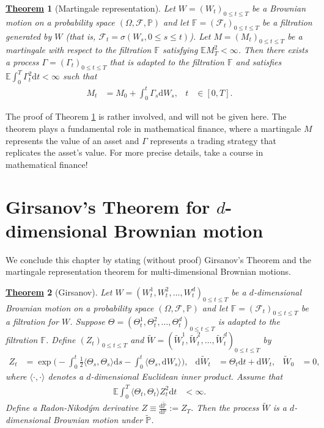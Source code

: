\documentclass[12pt]{book}
\numberwithin{equation}{chapter}
\theoremstyle{plain}
\newtheorem{theorem}{\underline{Theorem}}
\numberwithin{theorem}{section}
\theoremstyle{definition}
\numberwithin{exercise}{chapter}
\newcommand{\<}{\langle}
\renewcommand{\>}{\rangle}
\renewcommand{\(}{\left(}
\renewcommand{\)}{\right)}
\renewcommand{\[}{\left[}
\renewcommand{\]}{\right]}
\newcommand\Eb{\mathds{E}}
\newcommand\Fb{\mathds{F}}
\newcommand\Pb{\mathds{P}}
\newcommand\Fc{\mathscr{F}}
\newcommand\Om{\Omega}
\newcommand\sig{\sigma}
\newcommand\Gam{\Gamma}
\newcommand\Pbt{\widetilde{\Pb}}
\newcommand\Wt{\widetilde{W}}
\newcommand\dd{\mathrm{d}}
\begin{document}
\begin{theorem}[Martingale representation]
\label{thm:martingale.representation}
Let $W = (W_t)_{0 \leq t \leq T}$ be a Brownian motion on a probability space $(\Om,\Fc,\Pb)$ and let $\Fb=(\Fc_t)_{0 \leq t \leq T}$ be a filtration generated by $W$ (that is, $\Fc_t = \sig( W_s, 0 \leq s \leq t)$).  Let $M = (M_t)_{0 \leq t \leq T}$ be a martingale with respect to the filtration $\Fb$ satisfying $\Eb M_T^2 < \infty$.  Then there exists a process $\Gam = (\Gam_t)_{0 \leq t \leq T}$ that is adapted to the filtration $\Fb$ and satisfies $\Eb \int_0^T \Gam_t^2 \dd t < \infty$ such that
\begin{align}
M_t
	&=	M_0 + \int_0^t \Gam_s \dd W_s , &
t
	&\in [0,T] .
\end{align}
\end{theorem}

\noindent
The proof of Theorem \ref{thm:martingale.representation} is rather involved, and will not be given here.  The theorem plays a fundamental role in mathematical finance, where a martingale $M$ represents the value of an asset and $\Gam$ represents a trading strategy that replicates the asset's value.  For more precise details, take a course in mathematical finance!

\section{Girsanov's Theorem for $d$-dimensional Brownian motion}

\noindent
We conclude this chapter by stating (without proof) Girsanov's Theorem and the martingale representation theorem for multi-dimensional Brownian motions.

\begin{theorem}[Girsanov]
\label{thm:girsanov-d}
Let $W = (W_t^1,W_t^2,\ldots,W_t^d)_{0 \leq t \leq T}$ be a $d$-dimensional Brownian motion on a probability space $(\Om,\Fc,\Pb)$ and let $\Fb=(\Fc_t)_{0 \leq t \leq T}$ be a filtration for $W$.  Suppose $\Theta = (\Theta_t^1,\Theta_t^2,\ldots,\Theta_t^d)_{0 \leq t \leq T}$ is adapted to the filtration $\Fb$.  
Define $(Z_t)_{0 \leq t \leq T}$ and $\Wt = (\Wt_t^1,\Wt_t^2,\ldots,\Wt_t^d)_{0 \leq t \leq T}$ by
\begin{align}
Z_t
	&=	\exp \Big( - \int_0^t \tfrac{1}{2} \< \Theta_s, \Theta_s \> \dd s - \int_0^t \< \Theta_s,  \dd W_s \> \Big) , &
\dd \Wt_t
	&=	\Theta_t \dd t + \dd W_t , &
\Wt_0
	&=	0 ,
\end{align}
where $\< \cdot , \cdot \>$ denotes a $d$-dimensional Euclidean inner product.  Assume that
\begin{align}
\Eb \int_0^T \< \Theta_t, \Theta_t \> Z_t^2 \dd t
	&< \infty .
\end{align}
Define a Radon-Nikod\'ym derivative $Z \equiv \frac{\dd \Pbt}{\dd \Pb} := Z_T$.  Then the process $\Wt$ is a $d$-dimensional Brownian motion under $\Pbt$.
\end{theorem}
\end{document}
